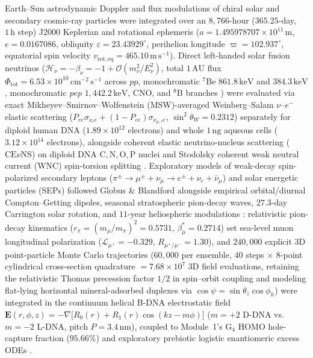 \documentclass[10pt,letterpaper]{article}
\theoremstyle{plain}
\theoremstyle{definition}
\begin{document}
Earth--Sun astrodynamic Doppler and flux modulations of chiral solar and secondary cosmic-ray particles were integrated over an $8{,}766$-hour ($365.25$-day, $1\,\mathrm{h}$ step) J2000 Keplerian and rotational ephemeris ($a = 1.495978707 \times 10^{11}\,\mathrm{m}$, $e = 0.0167086$, obliquity $\varepsilon = 23.43929^\circ$, perihelion longitude $\varpi = 102.937^\circ$, equatorial spin velocity $v_{\mathrm{rot,eq}} = 465.10\,\mathrm{m\,s^{-1}}$). Direct left-handed solar fusion neutrinos ($\mathcal{H}_\nu = -\beta_\nu = -1 + \mathcal{O}(m_\nu^2/E_\nu^2)$, total $1\,\mathrm{AU}$ flux $\Phi_{\mathrm{tot}} = 6.53 \times 10^{10}\,\mathrm{cm^{-2}\,s^{-1}}$ across $pp$, monochromatic $^7\mathrm{Be}$ $861.8\,\mathrm{keV}$ and $384.3\,\mathrm{keV}$, monochromatic $pep$ $1{,}442.2\,\mathrm{keV}$, CNO, and $^8\mathrm{B}$ branches \cite{appel2022borexino,barbeau2014prl}) were evaluated via exact Mikheyev--Smirnov--Wolfenstein (MSW)-averaged Weinberg--Salam $\nu\text{--}e^-$ elastic scattering ($P_{ee}\sigma_{\nu_e e} + (1 - P_{ee})\sigma_{\nu_{\mu,\tau} e}$, $\sin^2\theta_W = 0.2312$) separately for diploid human DNA ($1.89 \times 10^{12}$ electrons) and whole $1\,\mathrm{ng}$ aqueous cells ($3.12 \times 10^{14}$ electrons), alongside coherent elastic neutrino-nucleus scattering ($\mathrm{CE}\nu\mathrm{NS}$) on diploid DNA $\mathrm{C,N,O,P}$ nuclei and Stodolsky coherent weak neutral current (WNC) spin-torsion splitting \cite{jannat2026neutrinos}. Exploratory models of weak-decay spin-polarized secondary leptons ($\pi^\pm \to \mu^\pm + \nu_\mu \to e^\pm + \nu_e + \bar{\nu}_\mu$) and solar energetic particles (SEPs) followed Globus \& Blandford \cite{globus2020apjl,globus2021apj,globus2021muons} alongside empirical orbital/diurnal Compton--Getting dipoles, seasonal stratospheric pion-decay waves, $27.3$-day Carrington solar rotation, and $11$-year heliospheric modulations \cite{abbasi2010icecube,wang2025aps,gaisser2019icrc,malgin2015jetp}: relativistic pion-decay kinematics ($r_\pi = (m_\mu/m_\pi)^2 = 0.5731$, $\beta_\mu^* = 0.2714$) set sea-level muon longitudinal polarization ($\mathcal{L}_{\mu^+} = -0.329$, $R_{\mu^+/\mu^-} = 1.30$), and $240{,}000$ explicit 3D point-particle Monte Carlo trajectories ($60{,}000$ per ensemble, $40$ steps $\times$ $8$-point cylindrical cross-section quadrature $= 7.68 \times 10^7$ 3D field evaluations, retaining the relativistic Thomas precession factor $1/2$ in spin--orbit coupling and modeling flat-lying horizontal mineral-adsorbed duplexes via $\cos\psi = \sin\theta_z\cos\phi_h$) were integrated in the continuum helical B-DNA electrostatic field $\mathbf{E}(r,\phi,z) = -\nabla\bigl[R_0(r) + R_1(r)\cos(kz - m\phi)\bigr]$ ($m = +2$ D-DNA vs.\ $m = -2$ L-DNA, pitch $P = 3.4\,\mathrm{nm}$), coupled to Module~1's $\mathrm{G}_4$ HOMO hole-capture fraction ($95.66\%$) and exploratory prebiotic logistic enantiomeric excess ODEs \cite{globus2020apjl,ozturk2022pnas}.
\end{document}

